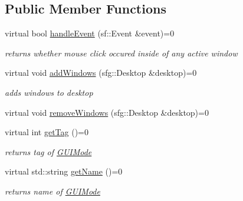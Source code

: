 \subsection*{Public Member Functions}
\begin{DoxyCompactItemize}
\item 
\hypertarget{classGUIMode_a00eae8004dac30abe03e6fd1e53fc849}{virtual bool \hyperlink{classGUIMode_a00eae8004dac30abe03e6fd1e53fc849}{handle\-Event} (sf\-::\-Event \&event)=0}\label{classGUIMode_a00eae8004dac30abe03e6fd1e53fc849}

\begin{DoxyCompactList}\small\item\em returns whether mouse click occured inside of any active window \end{DoxyCompactList}\item 
\hypertarget{classGUIMode_a1d1fec81001a6bf807760243d76de01c}{virtual void \hyperlink{classGUIMode_a1d1fec81001a6bf807760243d76de01c}{add\-Windows} (sfg\-::\-Desktop \&desktop)=0}\label{classGUIMode_a1d1fec81001a6bf807760243d76de01c}

\begin{DoxyCompactList}\small\item\em adds windows to desktop \end{DoxyCompactList}\item 
virtual void \hyperlink{classGUIMode_a7214583ea056553d7274cb3b8d8a1925}{remove\-Windows} (sfg\-::\-Desktop \&desktop)=0
\item 
\hypertarget{classGUIMode_ae96374e78394931314c1d36b61c4389c}{virtual int \hyperlink{classGUIMode_ae96374e78394931314c1d36b61c4389c}{get\-Tag} ()=0}\label{classGUIMode_ae96374e78394931314c1d36b61c4389c}

\begin{DoxyCompactList}\small\item\em returns tag of \hyperlink{classGUIMode}{G\-U\-I\-Mode} \end{DoxyCompactList}\item 
\hypertarget{classGUIMode_a0514db00b52d0d6f5d48b31bdbbac17c}{virtual std\-::string \hyperlink{classGUIMode_a0514db00b52d0d6f5d48b31bdbbac17c}{get\-Name} ()=0}\label{classGUIMode_a0514db00b52d0d6f5d48b31bdbbac17c}

\begin{DoxyCompactList}\small\item\em returns name of \hyperlink{classGUIMode}{G\-U\-I\-Mode} \end{DoxyCompactList}\end{DoxyCompactItemize}



